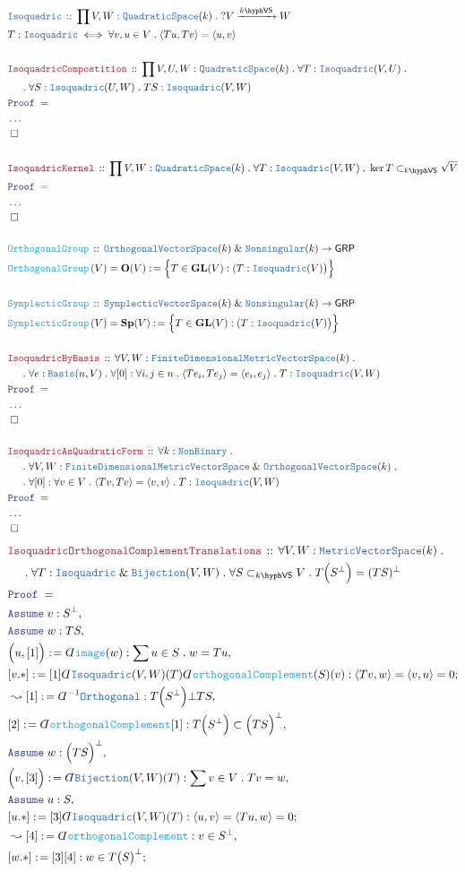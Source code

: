 \documentclass[12pt]{scrartcl}%
\newcommand{\TYPE}[1]{\textcolor{NavyBlue}{\mathtt{#1}}}%
\newcommand{\FUNC}[1]{\textcolor{Cerulean}{\mathtt{#1}}}%
\newcommand{\LOGIC}[1]{\textcolor{Blue}{\mathtt{#1}}}%
\newcommand{\THM}[1]{\textcolor{Maroon}{\mathtt{#1}}}%
\renewcommand{\.}{\; . \;} %
\newcommand{\de}{: \kern 0.1pc =} %
\newcommand{\Act}[1]{\left( #1 \right)} %
\newcommand{\Theorem}[2]{& \THM{#1} \, :: \, #2 \\ & \Proof = \\ } %
\newcommand{\DeclareType}[2]{& \TYPE{#1} \, :: \, #2 \\}%
\newcommand{\DefineType}[3]{& #1 : \TYPE{#2} \iff #3 \\}%
\newcommand{\DeclareFunc}[2]{& \FUNC{#1} \, :: \, #2 \\}%
\newcommand{\DefineNamedFunc}[4]{&  \FUNC{#1}\Act{#2} = #3 \de #4 \\}%
\newcommand{\NewLine}{\\ & \kern 1pc}%
\newcommand{\Page}[1]{ \begin{align*} #1 \end{align*}  }%
\newcommand{ \bd }{ \ByDef }%
\newcommand{\NoProof}{ & \ldots \\ \EndProof}%
\renewcommand{\And}{\; \& \;}%
\newcommand{\Say}[3]{& #1 \de #2 : #3, \\} %
\newcommand{\Conclude}[3]{& #1 \de #2 : #3; \\}%
\newcommand{\Derive}[3]{& \leadsto #1 \de #2 : #3, \\} %
\newcommand{\Assume}[2]{& \LOGIC{Assume} \; #1 : #2, \\} %
\newcommand{\QED}{\; \square} %
\newcommand{\EndProof}{& \QED \\} %
\newcommand{\ByDef}{\rotatebox[origin=c]{-180}{$D$}}%
\newcommand{\Proof}{\LOGIC{Proof} \; } %
\newcommand{\Arrow}[1]{\xrightarrow{#1}}%
\newcommand{\GRP}{\mathsf{GRP}} %
\newcommand{\subvec}[1]{\subset_{\VS{#1}}}%
\newcommand{\GL}{\mathbf{GL}}%
\newcommand{\OVS}{\TYPE{OrthogonalVectorSpace}}
\newcommand{\SVS}{\TYPE{SymplecticVectorSpace}}
\newcommand{\MVS}{\TYPE{MetricVectorSpace}}
\newcommand{\FDMVS}{\TYPE{FiniteDimensionalMetricVectorSpace}}
\newcommand{\Sp}{\mathbf{Sp}}
\newcommand{\VS}[1]{#1\hyph\mathsf{VS}} %
\renewcommand{\O}{\mathbf{O}}
\begin{document}
\Page{
	\DeclareType{Isoquadric}{\prod V,W : \TYPE{QuadraticSpace}(k) \. ? V \Arrow{\VS{k}} W}
	\DefineType{T}{Isoquadric}{\forall v,u \in V \. \langle Tu,Tv \rangle = \langle u, v \rangle}
	\\
	\Theorem{IsoquadricCompostition}{\prod V,U,W : \TYPE{QuadraticSpace}(k) \. \forall T : \TYPE{Isoquadric}(V,U) \. \NewLine \.  \forall S : \TYPE{Isoquadric}(U,W) \. TS : \TYPE{Isoquadric}(V,W)}
	\NoProof
	\\
	\Theorem{IsoquadricKernel}{\prod V,W : \TYPE{QuadraticSpace}(k) \. \forall T : \TYPE{Isoquadric}(V,W) \. \ker T \subvec{k} \sqrt{V}}
	\NoProof
	\\
	\DeclareFunc{OrthogonalGroup}{\OVS(k) \And \TYPE{Nonsingular}(k) \to \GRP}
	\DefineNamedFunc{OrthogonalGroup}{V}{\O(V)}{\Big\{ T \in \GL(V) : (T : \TYPE{Isoquadric}(V)\big) \Big\}}
	\\
	\DeclareFunc{SymplecticGroup}{\SVS(k) \And \TYPE{Nonsingular}(k) \to \GRP}
	\DefineNamedFunc{SymplecticGroup}{V}{\Sp(V)}{\Big\{ T \in \GL(V) : (T : \TYPE{Isoquadric}(V)\big) \Big\}}
	\\
	\Theorem{IsoquadricByBasis}{\forall V,W : \FDMVS(k) \. \NewLine \. \forall e : \TYPE{Basis}(n,V) \. \forall [0] : \forall i,j \in n \. \langle Te_i, Te_j \rangle  = \langle e_i, e_j \rangle \. T : \TYPE{Isoquadric}(V,W) }
	\NoProof
	\\
	\Theorem{IsoquadricAsQuadraticForm}{ \forall k : \TYPE{NonBinary} \. 
		\NewLine \. \forall V,W : \FDMVS \And \OVS(k) \. \NewLine \. \forall [0] : \forall v \in V \.  \langle Tv, Tv \rangle = \langle v, v \rangle \. T : \TYPE{Isoquadric}(V,W)  }
	\NoProof
}\Page{
	\Theorem{IsoquadricOrthogonalComplementTranslations}{
		\forall V,W : \MVS(k) \. \NewLine \.  
		\forall T : \TYPE{Isoquadric}\And \TYPE{Bijection}(V,W) \.  
		\forall S \subvec{k} V \.  
		T\Big(S^\bot\Big) = (TS)^\bot
	}
	\Assume{v}{S^\bot}
	\Assume{w}{TS}
	\Say{\Big(u,[1]\Big)}{\bd \FUNC{image}(w) }{ \sum u \in S \. w = Tu}
	\Conclude{[v.*]}{ [1]\bd \TYPE{Isoquadric}(V,W)(T)\bd \FUNC{orthogonalComplement}(S)(v)}{ \langle Tv, w \rangle = \langle v, u \rangle = 0  }
	\Derive{[1]}{\bd^{-1} \TYPE{Orthogonal}}{ T\Big(S^\bot\Big) \bot TS  }
	\Say{[2]}{\bd \FUNC{orthogonalComplement}[1]}{T\Big(S^\bot\Big) \subset \Big(TS\Big)^\bot}
	\Assume{w}{\Big( TS \Big)^\bot}
	\Say{\Big(v,[3]\Big)}{\bd \TYPE{Bijection}(V,W)(T)}{\sum v \in V \. Tv = w}
	\Assume{u}{S}
	\Conclude{[u.*]}{[3]\bd \TYPE{Isoquadric}(V,W)(T)}{ \langle u, v \rangle = \langle Tu, w \rangle = 0 }
	\Derive{[4]}{\bd \FUNC{orthogonalComplement}}{v \in S^\bot}
	\Conclude{[w.*]}{[3][4]}{w \in T\big(S\big)^\bot}
}
\end{document}
